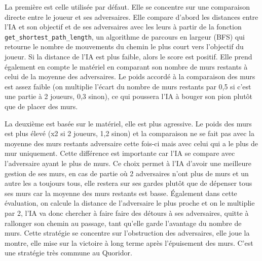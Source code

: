 \documentclass[a4paper]{article}
\begin{document}
\bigskip

La première est celle utilisée par défaut. Elle se concentre sur une comparaison directe entre le joueur et ses adversaires. 
Elle compare d’abord les distances entre l’IA et son objectif et de ses adversaires avec les leurs à partir de la fonction 
\texttt{get\_shortest\_path\_length}, un algorithme de parcours en largeur (BFS) qui retourne le nombre de mouvements du chemin le 
plus court vers l’objectif du joueur. Si la distance de l’IA est plus faible, alors le score est positif. Elle prend également en 
compte le matériel en comparant son nombre de murs restants à celui de la moyenne des adversaires. Le poids accordé à la comparaison 
des murs est assez faible (on multiplie l’écart du nombre de murs restants par 0,5 si c’est une partie à 2 joueurs, 0,3 sinon), 
ce qui poussera l’IA à bouger son pion plutôt que de placer des murs.

\bigskip

La deuxième est basée sur le matériel, elle est plus agressive. Le poids des murs est plus élevé (x2 si 2 joueurs, 1,2 sinon) et 
la comparaison ne se fait pas avec la moyenne des murs restants adversaire cette fois-ci mais avec celui qui a le plus de mur uniquement. 
Cette différence est importante car l’IA se compare avec l’adversaire ayant le plus de murs. Ce choix permet à l’IA d’avoir une meilleure 
gestion de ses murs, en cas de partie où 2 adversaires n’ont plus de murs et un autre les a toujours tous, elle restera sur ses gardes 
plutôt que de dépenser tous ses murs car la moyenne des murs restants est basse. Également dans cette évaluation, on calcule la distance 
de l’adversaire le plus proche et on le multiplie par 2, l’IA va donc chercher à faire faire des détours à ses adversaires, 
quitte à rallonger son chemin au passage, tant qu’elle garde l’avantage du nombre de murs. Cette stratégie se concentre sur 
l’obstruction des adversaires, elle joue la montre, elle mise sur la victoire à long terme après l’épuisement des murs. 
C’est une stratégie très commune au Quoridor.

\bigskip
\end{document}
